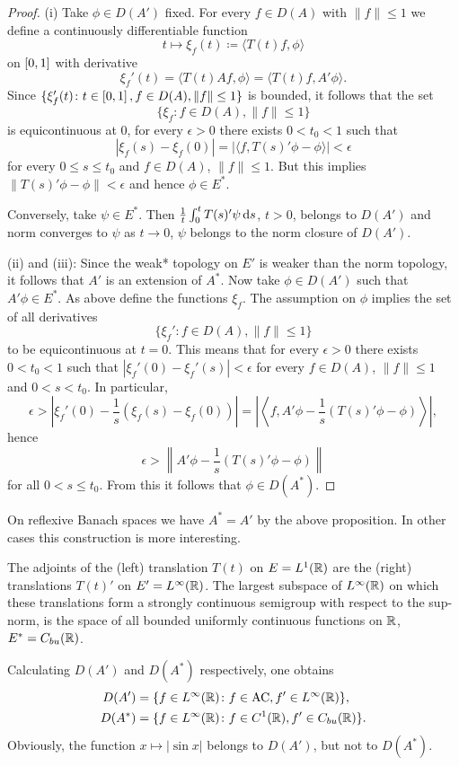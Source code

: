 \begin{proof}
(i) Take $\phi \in D(A')$ fixed.
For every $f \in D(A)$ with $\|f\| \leq 1$ we define a continuously differentiable function
\[
    t \mapsto \xi_{f}(t) \coloneq \langle T(t)f,\phi \rangle
\]
on $\left[ 0,1 \right]$ with derivative 
%
\[
	\xi_{f}'(t) = \langle T(t)Af,\phi \rangle = \langle T(t)f,A'\phi \rangle .
\]
%
Since $\{\xi_{f}'(t) \colon t \in \interval{0,1}, f \in D(A), \|f\| \leq 1\}$ is bounded, it follows that the set
\[
    \{\xi_{f} \colon f \in D(A), \|f\| \leq 1\}
\]
is equicontinuous at $0$, \ie for every $\epsilon > 0$ there exists $0 < t_{0} < 1$ such that
\[
    |\xi_{f}(s) - \xi_{f}(0)| = |\langle f,T(s)'\phi - \phi \rangle| < \epsilon
\]
for every $0 \leq s \leq t_{0}$ and $f \in D(A)$, $\|f\| \leq 1$.
But this implies $\|T(s)'\phi - \phi\| < \epsilon$ and hence $\phi \in E^{*}$.

Conversely, take $\psi \in E^{*}$.
Then $\frac{1}{t}\int_{0}^{t} T(s)'\psi \mathop{}\!\mathrm{d}{s}$, $t > 0$, belongs to $D(A')$ and norm converges to $\psi$ as $t \to 0$, \ie $\psi$ belongs to the norm closure of\/ $D(A')$.

(ii) and (iii): Since the weak* topology on $E'$ is weaker than the norm topology, it follows that $A'$ is an extension of\/ $A^{*}$.
Now take $\phi \in D(A')$ such that $A'\phi \in E^{*}$.
As above define the functions $\xi_{f}$. 
The assumption on $\phi$ implies the set of all derivatives
\[
\{\xi_{f}' \colon f \in D(A), \|f\| \leq 1\}
\]
to be equicontinuous at $t = 0$. 
This means that for every $\epsilon > 0$ there exists $0 < t_{0} < 1$ such that $|\xi_f'(0) - \xi_f'(s)| < \epsilon$ for every $f \in D(A)$, $\|f\| \leq 1$ and $0 < s < t_{0}$.
In particular,
\[
    \epsilon > \left\lvert \xi_f'(0) - \frac{1}{s}(\xi_f(s)-\xi_f(0)) \right\rvert 
    = \left\lvert \left\langle f,A'\phi - \frac{1}{s}(T(s)'\phi-\phi) \right\rangle \right\rvert ,
\]
hence
\[
    \epsilon > \left\|A'\phi - \frac{1}{s}(T(s)'\phi-\phi) \right\|
\]
for all $0 < s \leq t_{0}$.
From this it follows that $\phi \in D(A^*)$.
\end{proof}
On reflexive Banach spaces we have $A^* = A'$ by the above proposition.
In other cases this construction is more interesting.
\begin{example*}[continued]\label{ex:a1-3.4}
The adjoints of the (left) translation $T(t)$ on $E = L^1(\mathbb{R})$ are the (right) translations $T(t)'$ on $E' = L^\infty(\mathbb{R})$.
The largest subspace of\/ $L^\infty(\mathbb{R})$ on which these translations form a strongly continuous semigroup with respect to the sup-norm, is the space of all bounded uniformly continuous functions on $\mathbb{R}$, \ie $E^* = C_{bu}(\mathbb{R})$.

Calculating $D(A')$ and $D(A^*)$ respectively, one obtains
\begin{align*}
    D(A') &= \{f \in L^\infty(\mathbb{R}) \colon f \in \mathrm{AC}, f' \in L^\infty(\mathbb{R})\}, \\
    D(A^*) &= \{f \in L^\infty(\mathbb{R}) \colon f \in C^1(\mathbb{R}), f' \in C_{bu}(\mathbb{R})\}.
\end{align*}
Obviously, the function $x \mapsto |\sin x|$ belongs to $D(A')$, but not to $D(A^*)$.
\end{example*}
